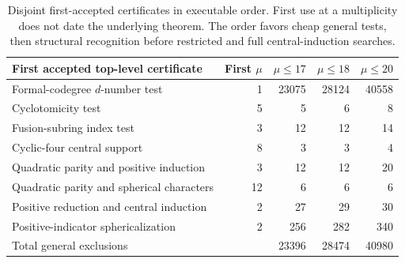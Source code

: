 \begin{table}[ht]\centering\small
\begin{tabular}{lrrrr}\toprule
First accepted top-level certificate&First $\mu$&$\mu\le17$&$\mu\le18$&$\mu\le20$\\\midrule
Formal-codegree $d$-number test&1&23075&28124&40558\\
Cyclotomicity test&5&5&6&8\\
Fusion-subring index test&3&12&12&14\\
Cyclic-four central support&8&3&3&4\\
Quadratic parity and positive induction&3&12&12&20\\
Quadratic parity and spherical characters&12&6&6&6\\
Positive reduction and central induction&2&27&29&30\\
Positive-indicator sphericalization&2&256&282&340\\
\midrule Total general exclusions&&23396&28474&40980\\
\bottomrule\end{tabular}
\caption{Disjoint first-accepted certificates in executable order. First use at a multiplicity does not date the underlying theorem. The order favors cheap general tests, then structural recognition before restricted and full central-induction searches.}\label{tab:allocation}\end{table}
